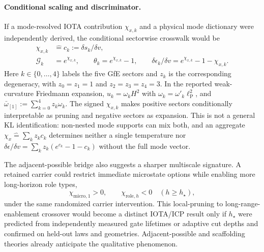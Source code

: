 \paragraph{Conditional scaling and discriminator.}
If a mode-resolved IOTA contribution $\chi_{x,k}$ and a physical mode dictionary
were independently derived, the conditional sectorwise crosswalk would be
\begin{equation}
 \begin{aligned}
 \chi_{x,k}&\widehat{=}c_k:=\delta s_k/\delta v,\\
 \mathcal G_k&=e^{\chi_{x,k}},\qquad
 \theta_k=e^{\chi_{x,k}}-1,\qquad
 \delta\epsilon_k/\delta v=e^{\chi_{x,k}}-1-\chi_{x,k}.
 \end{aligned}
 \label{eq:gfe-conditional-crosswalk}
\end{equation}
Here $k\in\{0,\ldots,4\}$ labels the five GfE sectors and $z_k$ is the
corresponding degeneracy, with $z_0=z_1=1$ and $z_2=z_3=z_4=3$. In the
reported weak-curvature Friedmann expansion, $u_k=\omega_kH^2$ with
$\omega_k=\omega'_k\ell_{\mathrm P}^2$, and
$\bar\omega_{[1]}:=\sum_{k=0}^{4}z_k\omega_k$.
The signed $\chi_{x,k}$ makes positive sectors conditionally interpretable as
pruning and negative sectors as expansion. This is not a general KL
identification: non-nested mode supports can mix both, and an aggregate
$\chi_x\widehat{=}\sum_kz_kc_k$ determines neither a single temperature nor
$\delta\epsilon/\delta v=\sum_kz_k(e^{c_k}-1-c_k)$ without the full mode vector.

The adjacent-possible bridge also suggests a sharper multiscale signature. A
retained carrier could restrict immediate microstate options while enabling
more long-horizon role types,
\begin{equation}
 \chi_{\mathrm{micro},1}>0,
 \qquad
 \chi_{\mathrm{role},h}<0\quad(h\ge h_\star),
 \label{eq:constraint-enablement-crossover}
\end{equation}
under the same randomized carrier intervention. This local-pruning to
long-range-enablement crossover would become a distinct IOTA/ICP result only if
$h_\star$ were predicted from independently measured gate lifetimes or adaptive
cut depths and confirmed on held-out laws and geometries. Adjacent-possible and
scaffolding theories already anticipate the qualitative phenomenon.

